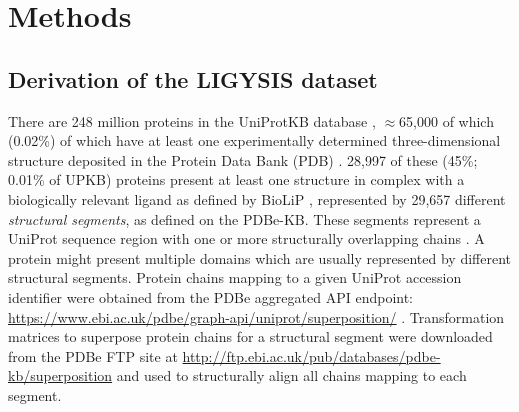 \section{Methods}

\subsection{Derivation of the LIGYSIS dataset}

There are 248 million proteins in the UniProtKB database \cite{UNIPROT_2020_UNIPROT}, $\approx$65,000 of which (0.02\%) of which have at least one experimentally determined three-dimensional structure deposited in the Protein Data Bank (PDB) \cite{ARMSTRONG_2020_PDBE}. 28,997 of these (45\%; 0.01\% of UPKB) proteins present at least one structure in complex with a biologically relevant ligand as defined by BioLiP \cite{YANG_2013_BIOLIP}, represented by 29,657 different \textit{structural segments}, as defined on the PDBe-KB. These segments represent a UniProt sequence region with one or more structurally overlapping chains  \cite{ELLAWAY_2024_CONFORMATIONS}. A protein might present multiple domains which are usually represented by different structural segments. Protein chains mapping to a given UniProt accession identifier were obtained from the PDBe aggregated API endpoint: \url{https://www.ebi.ac.uk/pdbe/graph-api/uniprot/superposition/} \cite{PDBEKB_2019_PDBEKB}. Transformation matrices to superpose protein chains for a structural segment were downloaded from the PDBe FTP site at \url{http://ftp.ebi.ac.uk/pub/databases/pdbe-kb/superposition} \cite{PDBE_2022_PDBEKB} and used to structurally align all chains mapping to each segment.

